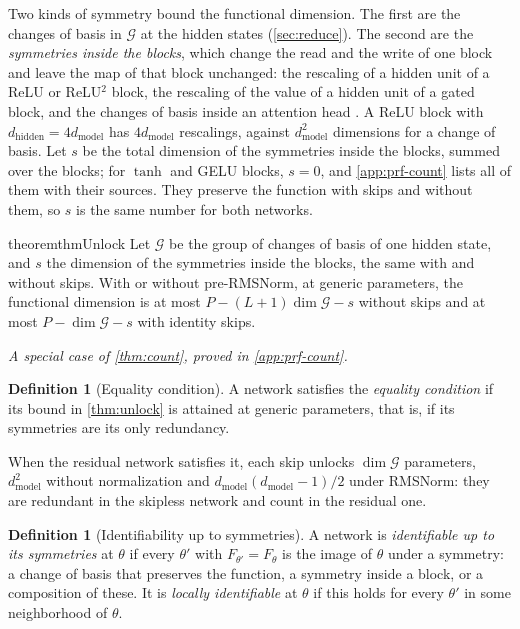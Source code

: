 \documentclass[10pt]{article}
\theoremstyle{definition}
\newtheorem{definition}[theorem]{Definition}
\theoremstyle{remark}
\newcommand{\dm}{d_{\mathrm{model}}}
\newcommand{\dhid}{d_{\mathrm{hidden}}}
\newcommand{\G}{\mathcal{G}}
\newcommand{\specialof}[2]{\par\vspace{-0.4\baselineskip}\noindent\hfill{\small\itshape A special case of \cref{#1}, proved in \cref{#2}.}\par\smallskip}
\begin{document}
Two kinds of symmetry bound the functional dimension. The first are the changes of basis in $\G$ at the hidden states (\cref{sec:reduce}). The second are the \emph{symmetries inside the blocks}, which change the read and the write of one block and leave the map of that block unchanged: the rescaling of a hidden unit of a ReLU or ReLU$^2$ block, the rescaling of the value of a hidden unit of a gated block, and the changes of basis inside an attention head \citep{rolnick2020reverse,godfrey2022symmetries,elhage2021circuits,wang2025gauge}. A ReLU block with $\dhid = 4\dm$ has $4\dm$ rescalings, against $\dm^2$ dimensions for a change of basis. Let $s$ be the total dimension of the symmetries inside the blocks, summed over the blocks; for $\tanh$ and GELU blocks, $s = 0$, and \cref{app:prf-count} lists all of them with their sources. They preserve the function with skips and without them, so $s$ is the same number for both networks.

\begin{restatable}{theorem}{thmUnlock}\label{thm:unlock}
Let $\G$ be the group of changes of basis of one hidden state, and $s$ the dimension of the symmetries inside the blocks, the same with and without skips. With or without pre-RMSNorm, at generic parameters, the functional dimension is at most $P - (L+1)\dim\G - s$ without skips and at most $P - \dim\G - s$ with identity skips.
\end{restatable}
\specialof{thm:count}{app:prf-count}

\begin{definition}[Equality condition]\label{def:equality}
A network satisfies the \emph{equality condition} if its bound in \cref{thm:unlock} is attained at generic parameters, that is, if its symmetries are its only redundancy.
\end{definition}

When the residual network satisfies it, each skip unlocks $\dim\G$ parameters, $\dm^2$ without normalization and $\dm(\dm-1)/2$ under RMSNorm: they are redundant in the skipless network and count in the residual one.

\begin{definition}[Identifiability up to symmetries]\label{def:ident}
A network is \emph{identifiable up to its symmetries} at $\theta$ if every $\theta'$ with $F_{\theta'} = F_\theta$ is the image of $\theta$ under a symmetry: a change of basis that preserves the function, a symmetry inside a block, or a composition of these. It is \emph{locally identifiable} at $\theta$ if this holds for every $\theta'$ in some neighborhood of $\theta$.
\end{definition}
\end{document}
